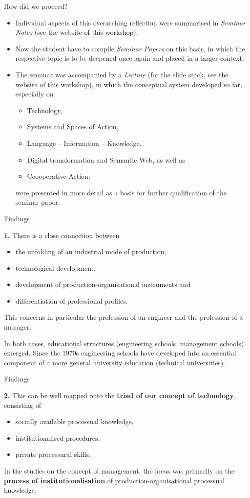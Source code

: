\documentclass{beamer}
\begin{document}
\begin{frame}{How did we proceed?} 
\begin{itemize}
\item Individual aspects of this overarching reflection were summarised in
  \emph{Seminar Notes} (see the website of this workshop).
\item Now the student have to compile \emph{Seminar Papers} on this basis, in
  which the respective topic is to be deepened once again and placed in a
  larger context.
\item The seminar was accompanied by a \emph{Lecture} (for the slide stack,
  see the website of this workshop), in which the conceptual system developed
  so far, especially on 
  \begin{itemize}
  \item Technology, 
  \item Systems and Spaces of Action,
  \item Language -- Information -- Knowledge, 
  \item Digital transformation and Semantic Web, as well as
  \item Ccooperative Action,
  \end{itemize}
  were presented in more detail as a basis for further qualification of the
  seminar paper.
\end{itemize}
\end{frame}
\begin{frame}{Findings}

\textbf{1.}
There is a close connection between 
\begin{itemize}
\item the unfolding of an industrial mode of production,
\item technological development,
\item development of production-organisational instruments and
\item differentiation of professional profiles.
\end{itemize}
This concerns in particular the profession of an engineer and the profession
of a manager.

In both cases, educational structures (engineering schools, management
schools) emerged. Since the 1970s engineering schools have developed into an
essential component of a more general university education (technical
universities).

\end{frame}
\begin{frame}{Findings}

\textbf{2.}
This can be well mapped onto the \textbf{triad of our concept of technology},
consisting of 
\begin{itemize}
\item socially available processual knowledge,
\item institutionalised procedures,
\item private processural skills. 
\end{itemize}
In the studies on the concept of management, the focus was primarily on the
\textbf{process of institutionalisation} of production-organisational
processual knowledge.
\end{frame}
\end{document}
